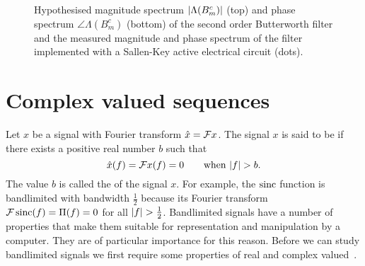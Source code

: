 \begin{figure}[p]
\centering
\begin{shaded}

\caption{Hypothesised magnitude spectrum $\left\vert \Lambda(B_m^c) \right\vert$ (top) and phase spectrum $\angle{\Lambda(B_m^c)}$ (bottom) of the second order Butterworth filter and the measured magnitude and phase spectrum of the filter implemented with a Sallen-Key active electrical circuit (dots).}\label{fig:test:butterworthspectrum}
\end{shaded}
\end{figure}

\section{Complex valued sequences}

Let $x$ be a signal with Fourier transform $\hat{x} = {\mathcal F} x$.  The signal $x$ is said to be  if there exists a positive real number $b$ such that 
\[
\hat{x}(f) = {\mathcal F} x(f) = 0 \qquad \text{when $\left\vert f \right\vert > b$}.
\]  
The value $b$ is called the  of the signal $x$.  For example, the $\operatorname{sinc}$ function is bandlimited with bandwidth $\tfrac{1}{2}$ because its Fourier transform ${\mathcal F} \operatorname{sinc}(f) = \Pi(f) = 0$ for all $\left\vert f \right\vert > \tfrac{1}{2}$.
Bandlimited signals have a number of properties that make them suitable for representation and manipulation by a computer.  They are of particular importance for this reason.  Before we can study bandlimited signals we first require some properties of real and complex valued~.

